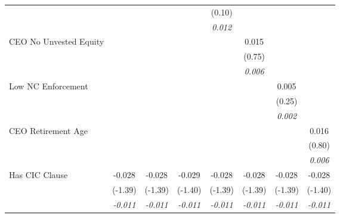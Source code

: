 {\begin{tabular}{l*{7}{c}}
                &                  &                  &                  &   (0.10)         &                  &                  &                  \\
                &                  &                  &                  &\textit{0.012}         &                  &                  &                  \\
CEO No Unvested Equity&                  &                  &                  &                  &    0.015         &                  &                  \\
                &                  &                  &                  &                  &   (0.75)         &                  &                  \\
                &                  &                  &                  &                  &\textit{0.006}         &                  &                  \\
Low NC Enforcement&                  &                  &                  &                  &                  &    0.005         &                  \\
                &                  &                  &                  &                  &                  &   (0.25)         &                  \\
                &                  &                  &                  &                  &                  &\textit{0.002}         &                  \\
CEO Retirement Age&                  &                  &                  &                  &                  &                  &    0.016         \\
                &                  &                  &                  &                  &                  &                  &   (0.80)         \\
                &                  &                  &                  &                  &                  &                  &\textit{0.006}         \\
Has CIC Clause  &   -0.028         &   -0.028         &   -0.029         &   -0.028         &   -0.028         &   -0.028         &   -0.028         \\
                &  (-1.39)         &  (-1.39)         &  (-1.40)         &  (-1.39)         &  (-1.39)         &  (-1.39)         &  (-1.40)         \\
                &\textit{-0.011}         &\textit{-0.011}         &\textit{-0.011}         &\textit{-0.011}         &\textit{-0.011}         &\textit{-0.011}         &\textit{-0.011}         \\

\end{tabular}}
